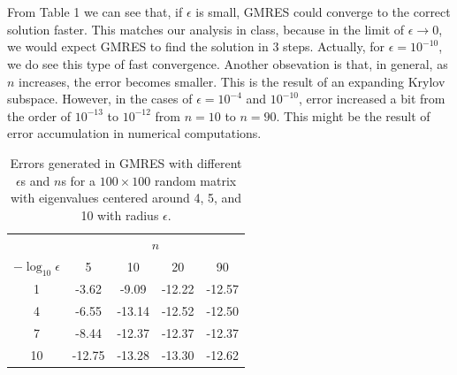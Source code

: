 \documentclass[11pt]{article}
\begin{document}
\section{}
From Table 1 we can see that, if $\epsilon$ is small, GMRES could converge to the correct solution faster. This matches our analysis in class, because in the limit of $\epsilon\to0$, we would expect GMRES to find the solution in 3 steps. Actually, for $\epsilon=10^{-10}$, we do see this type of fast convergence. Another obsevation is that, in general, as $n$ increases, the error becomes smaller. This is the result of an expanding Krylov subspace. However, in the cases of $\epsilon=10^{-4}$ and $10^{-10}$, error increased a bit from the order of $10^{-13}$ to $10^{-12}$ from $n=10$ to $n=90$. This might be the result of error accumulation in numerical computations.
\begin{center}
\begin{table}
\caption{Errors generated in GMRES with different $\epsilon$s and $n$s for a $100\times100$ random matrix with eigenvalues centered around 4, 5, and 10 with radius $\epsilon$.}
\centering
\begin{tabular}[h]{| c |  c c c c |} 
\hline
 & \multicolumn{4}{c|}{$n$} \\
 $-\log_{10}\epsilon$  & 5 & 10 & 20 & 90 \\[0.3ex] \hline
   1  & -3.62 & -9.09 & -12.22 & -12.57 \\
  4  & -6.55 & -13.14 & -12.52 & -12.50 \\
  7  & -8.44 & -12.37 & -12.37 & -12.37 \\
 10  & -12.75 & -13.28 & -13.30 & -12.62 \\\hline
\end{tabular}
\end{table}
\end{center}
\end{document}
